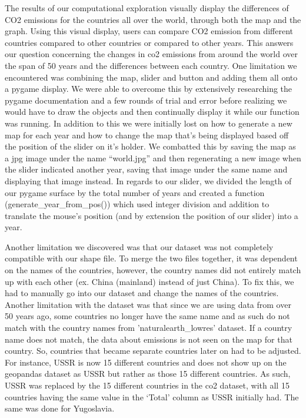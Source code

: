 \documentclass[fontsize=11pt]{article}
\begin{document}
The results of our computational exploration visually display the differences of CO2 emissions for the countries all over the world, through both the map and the graph. Using this visual display, users can compare CO2 emission from different countries compared to other countries or compared to other years. This answers our question concerning the changes in co2 emissions from around the world over the span of 50 years and the differences between each country.
One limitation we encountered was combining the map, slider and button and adding them all onto a pygame display. We were able to overcome this by extensively researching the pygame documentation and a few rounds of trial and error before realizing we would have to draw the objects and then continually display it while our function was running. In addition to this we were initially lost on how to generate a new map for each year and how to change the map that’s being displayed based off the position of the slider on it’s holder. We combatted this by saving the map as a jpg image under the name “world.jpg” and then regenerating a new image when the slider indicated another year, saving that image under the same name and displaying that image instead. In regards to our slider, we divided the length of our pygame surface by the total number of years and created a function (generate\_year\_from\_pos()) which used integer division and addition to translate the mouse’s position (and by extension the position of our slider) into a year. 

Another limitation we discovered was that our dataset was not completely compatible with our shape file. To merge the two files together, it was dependent on the names of the countries, however, the country names did not entirely match up with each other (ex. China (mainland) instead of just China).  To fix this, we had to manually go into our dataset and change the names of the countries. Another limitation with the dataset was that since we are using  data from over 50 years ago, some countries no longer have the same name and as such do not match with the country names from 'naturalearth\_lowres' dataset. If a country name does not match, the data about emissions is not seen on the map for that country. So, countries that became separate countries later on had to be adjusted. For instance, USSR is now 15 different countries and does not show up on the geopandas dataset as USSR but rather as those 15 different countries. As such, USSR was replaced by the 15 different countries in the co2 dataset, with all 15 countries having the same value in the ‘Total’ column as USSR initially had. The same was done for Yugoslavia.
\end{document}
